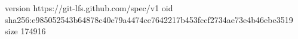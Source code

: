 version https://git-lfs.github.com/spec/v1
oid sha256:e985052543b64878c40e79a4474ce7642217b453fccf2734ae73e4b46ebe3519
size 174916
